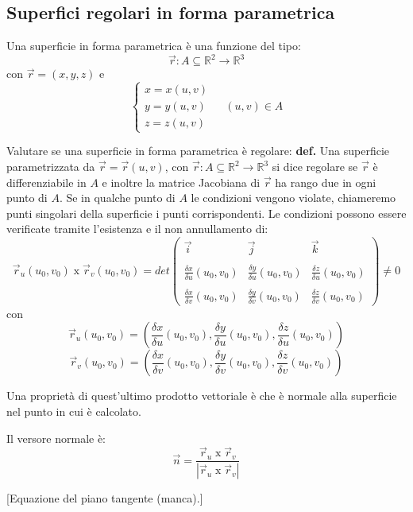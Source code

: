 \subsection*{Superfici regolari in forma parametrica}
Una superficie in forma parametrica è una funzione del tipo:
\[
    \vec{r}:A \subseteq \mathbb{R}^2 \rightarrow \mathbb{R}^3
\]
con $\vec{r} = (x,y,z)$ e
\[
    \begin{cases}
        x=x(u,v) \\
        y=y(u,v)\\
        z=z(u,v)
    \end{cases} \;\;\;\;(u,v) \in A
\] 
\begin{tcolorbox}
Valutare se una superficie in forma parametrica è regolare:\newline
\textbf{def.} Una superficie parametrizzata da $\vec{r} = \vec{r}(u,v)$, con $\vec{r}: A \subseteq \mathbb{R}^2 \rightarrow \mathbb{R}^3$ si dice regolare se $\vec{r}$ è differenziabile in $A$ e inoltre la matrice Jacobiana di $\vec{r}$ ha rango due in ogni punto di $A$. Se in qualche punto di $A$ le condizioni vengono violate, chiameremo punti singolari della superficie i punti corrispondenti.\newline
Le condizioni possono essere verificate tramite l'esistenza e il non annullamento di:
\[
    \vec{r}_u(u_0, v_0) \;\text{x}\; \vec{r}_v(u_0, v_0) = det \left(\begin{matrix}
        \vec{i} & \vec{j} & \vec{k}\\
        \\
        \frac{\delta x}{\delta u}(u_0,v_0) & \frac{\delta y}{\delta u}(u_0,v_0) & \frac{\delta z}{\delta u}(u_0,v_0)\\
        \\
        \frac{\delta x}{\delta v}(u_0,v_0) & \frac{\delta y}{\delta v}(u_0,v_0) & \frac{\delta z}{\delta v}(u_0,v_0)
    \end{matrix}\right) \neq 0
\]
con
\[
    \vec{r}_u(u_0, v_0) = ( \frac{\delta x}{\delta u}(u_0,v_0) , \frac{\delta y}{\delta u}(u_0,v_0) , \frac{\delta z}{\delta u}(u_0,v_0) )
\]
\[
    \vec{r}_v(u_0, v_0) = ( \frac{\delta x}{\delta v}(u_0,v_0) , \frac{\delta y}{\delta v}(u_0,v_0) , \frac{\delta z}{\delta v}(u_0,v_0) )
\]
\end{tcolorbox}
Una proprietà di quest'ultimo prodotto vettoriale è che è normale alla superficie nel punto in cui è calcolato. 
\begin{tcolorbox}
    Il versore normale è:
    \[
        \vec{n} = \frac{\vec{r}_u \;\text{x}\; \vec{r}_v}{|\vec{r}_u \;\text{x}\; \vec{r}_v|}
    \]
\end{tcolorbox}
[Equazione del piano tangente (manca).]
